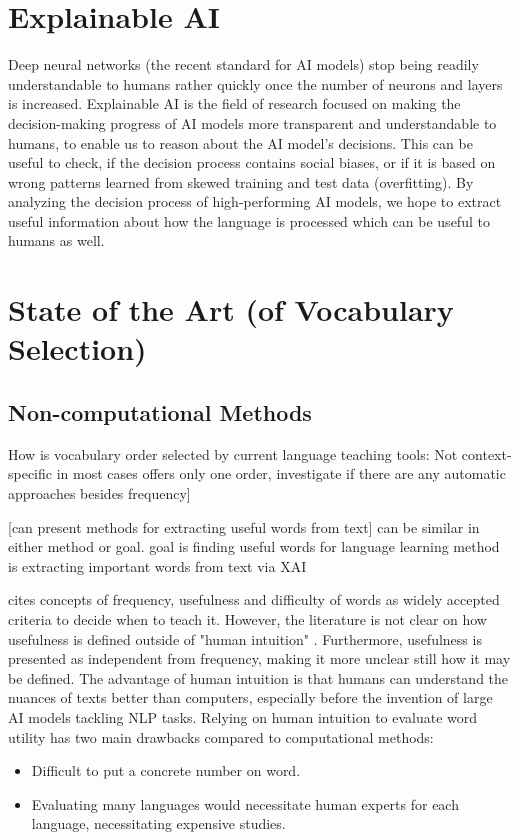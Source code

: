 \section{Explainable AI}
Deep neural networks (the recent standard for AI models) stop being readily understandable to humans rather quickly once the number of neurons and layers is increased.
Explainable AI is the field of research focused on making the decision-making progress of AI models more transparent and understandable to humans, to enable us to reason about the AI model's decisions. 
This can be useful to check, if the decision process contains social biases, or if it is based on wrong patterns learned from skewed training and test data (overfitting).
By analyzing the decision process of high-performing AI models, we hope to extract useful information about how the language is processed which can be useful to humans as well.



\section{State of the Art (of Vocabulary Selection)} \label{sec:state-of-the-art-vocabulary-selection}
\subsection{Non-computational Methods}
How is vocabulary order selected by current language teaching tools:
Not context-specific in most cases
offers only one order,
investigate if there are any automatic approaches besides frequency]

[can present methods for extracting useful words from text]
can be similar in either method or goal.
goal is finding useful words for language learning
method is extracting important words from text via XAI

\cite{heChoosingWordsTeach2019} cites concepts of frequency, usefulness and difficulty of words as widely accepted criteria to decide when to teach it.
However, the literature is not clear on how usefulness is defined outside of "human intuition" \cite{heChoosingWordsTeach2019}.
Furthermore, usefulness is presented as independent from frequency, making it more unclear still how it may be defined.
The advantage of human intuition is that humans can understand the nuances of texts better than computers, especially before the invention of large AI models tackling NLP tasks.
Relying on human intuition to evaluate word utility has two main drawbacks compared to computational methods:
\begin{itemize}
	\item Difficult to put a concrete number on word.
	\item Evaluating many languages would necessitate human experts for each language, necessitating expensive studies.
\end{itemize}

